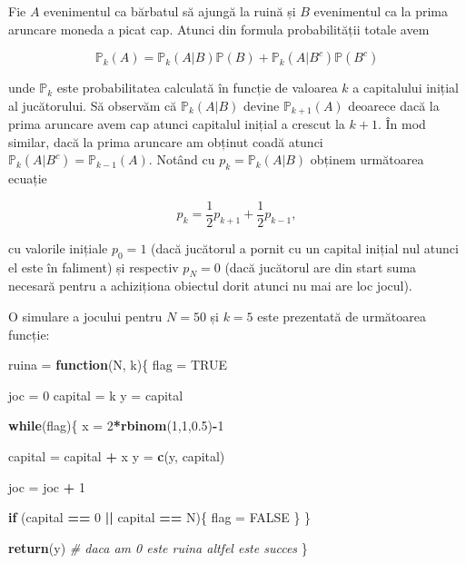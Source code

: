 \documentclass[]{article}
\newenvironment{Shaded}{\begin{snugshade}}{\end{snugshade}}
\newcommand{\CommentTok}[1]{\textcolor[rgb]{0.56,0.35,0.01}{\textit{#1}}}
\newcommand{\ControlFlowTok}[1]{\textcolor[rgb]{0.13,0.29,0.53}{\textbf{#1}}}
\newcommand{\DecValTok}[1]{\textcolor[rgb]{0.00,0.00,0.81}{#1}}
\newcommand{\FloatTok}[1]{\textcolor[rgb]{0.00,0.00,0.81}{#1}}
\newcommand{\KeywordTok}[1]{\textcolor[rgb]{0.13,0.29,0.53}{\textbf{#1}}}
\newcommand{\NormalTok}[1]{#1}
\newcommand{\OperatorTok}[1]{\textcolor[rgb]{0.81,0.36,0.00}{\textbf{#1}}}
\newcommand{\OtherTok}[1]{\textcolor[rgb]{0.56,0.35,0.01}{#1}}
\newcommand{\StringTok}[1]{\textcolor[rgb]{0.31,0.60,0.02}{#1}}
\begin{document}
Fie \(A\) evenimentul ca bărbatul să ajungă la ruină și \(B\)
evenimentul ca la prima aruncare moneda a picat cap. Atunci din formula
probabilității totale avem

\[
  \mathbb{P}_k(A) = \mathbb{P}_k(A|B)\mathbb{P}(B)+\mathbb{P}_k(A|B^c)\mathbb{P}(B^c)
\]

unde \(\mathbb{P}_k\) este probabilitatea calculată în funcție de
valoarea \(k\) a capitalului inițial al jucătorului. Să observăm că
\(\mathbb{P}_k(A|B)\) devine \(\mathbb{P}_{k+1}(A)\) deoarece dacă la
prima aruncare avem cap atunci capitalul inițial a crescut la \(k+1\).
În mod similar, dacă la prima aruncare am obținut coadă atunci
\(\mathbb{P}_k(A|B^c) = \mathbb{P}_{k-1}(A)\). Notând cu
\(p_k = \mathbb{P}_k(A|B)\) obținem următoarea ecuație

\[
  p_k = \frac{1}{2}p_{k+1} + \frac{1}{2}p_{k-1},
\]

cu valorile inițiale \(p_0=1\) (dacă jucătorul a pornit cu un capital
inițial nul atunci el este în faliment) și respectiv \(p_N=0\) (dacă
jucătorul are din start suma necesară pentru a achiziționa obiectul
dorit atunci nu mai are loc jocul).

O simulare a jocului pentru \(N = 50\) și \(k = 5\) este prezentată de
următoarea funcție:

\begin{Shaded}
\begin{Highlighting}[]
\NormalTok{ruina =}\StringTok{ }\ControlFlowTok{function}\NormalTok{(N, k)\{}
\NormalTok{  flag =}\StringTok{ }\OtherTok{TRUE}

\NormalTok{  joc =}\StringTok{ }\DecValTok{0}
\NormalTok{  capital =}\StringTok{ }\NormalTok{k}
\NormalTok{  y =}\StringTok{ }\NormalTok{capital}
  
  \ControlFlowTok{while}\NormalTok{(flag)\{}
\NormalTok{    x =}\StringTok{ }\DecValTok{2}\OperatorTok{*}\KeywordTok{rbinom}\NormalTok{(}\DecValTok{1}\NormalTok{,}\DecValTok{1}\NormalTok{,}\FloatTok{0.5}\NormalTok{)}\OperatorTok{-}\DecValTok{1}
    
\NormalTok{    capital =}\StringTok{ }\NormalTok{capital }\OperatorTok{+}\StringTok{ }\NormalTok{x}
\NormalTok{    y =}\StringTok{ }\KeywordTok{c}\NormalTok{(y, capital)}
    
\NormalTok{    joc =}\StringTok{ }\NormalTok{joc }\OperatorTok{+}\StringTok{ }\DecValTok{1}
    
    \ControlFlowTok{if}\NormalTok{ (capital }\OperatorTok{==}\StringTok{ }\DecValTok{0} \OperatorTok{||}\StringTok{ }\NormalTok{capital }\OperatorTok{==}\StringTok{ }\NormalTok{N)\{}
\NormalTok{      flag =}\StringTok{ }\OtherTok{FALSE}
\NormalTok{    \}}
\NormalTok{  \}}
  
  \KeywordTok{return}\NormalTok{(y) }\CommentTok{# daca am 0 este ruina altfel este succes}
\NormalTok{\}}
\end{Highlighting}
\end{Shaded}
\end{document}

